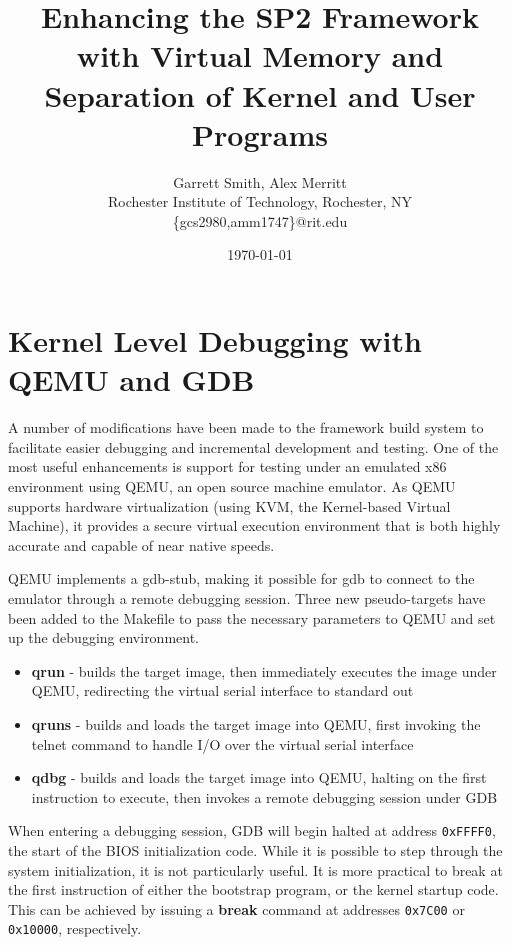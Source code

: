 \documentclass[titlepage]{article}
\title{Enhancing the SP2 Framework with Virtual Memory and Separation of
       Kernel and User Programs}
\author{Garrett Smith, Alex Merritt\\
{\small Rochester Institute of Technology, Rochester, NY}\\
{\small \{gcs2980,amm1747\}@rit.edu}}
\date{\today}
\begin{document}
\maketitle
\newpage

\tableofcontents
\newpage

\listoffigures
\newpage

%
%

\section{Kernel Level Debugging with QEMU and GDB}

A number of modifications have been made to the framework build system to
facilitate easier debugging and incremental development and testing. One of the
most useful enhancements is support for testing under an emulated x86 environment
using QEMU, an open source machine emulator. As QEMU supports hardware
virtualization (using KVM, the Kernel-based Virtual Machine), it provides a
secure virtual execution environment that is both highly accurate and capable of
near native speeds.

QEMU implements a gdb-stub, making it possible for gdb to connect to the 
emulator through a remote debugging session. Three new pseudo-targets have been
added to the Makefile to pass the necessary parameters to QEMU and set up the
debugging environment.

\begin{itemize}
\item \textbf{qrun} - builds the target image, then immediately executes the
    image under QEMU, redirecting the virtual serial interface to standard out
\item \textbf{qruns} - builds and loads the target image into QEMU, first
    invoking the telnet command to handle I/O over the virtual serial interface
\item \textbf{qdbg} - builds and loads the target image into QEMU, halting on the
    first instruction to execute, then invokes a remote debugging session under
    GDB
\end{itemize}

When entering a debugging session, GDB will begin halted at address
\verb!0xFFFF0!, the start of the BIOS initialization code. While it is possible
to step through the system initialization, it is not particularly useful. It is
more practical to break at the first instruction of either the bootstrap
program, or the kernel startup code. This can be achieved by issuing a
\textbf{break} command at addresses \verb!0x7C00! or \verb!0x10000!,
respectively.
\end{document}

